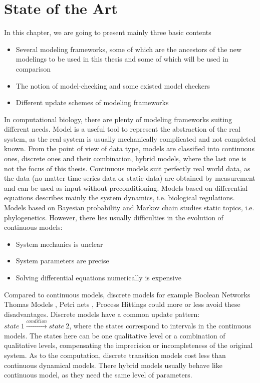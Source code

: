 \chapter{State of the Art}\label{chap:stateOfTheArt}
\begin{mybox}
In this chapter, we are going to present mainly three basic contents
\begin{itemize}
    \item Several modeling frameworks, some of which are the ancestors of the new modelings to be used in this thesis and some of which will be used in comparison
    \item The notion of model-checking and some existed model checkers 
    \item Different update schemes of modeling frameworks
\end{itemize}
\end{mybox}

In computational biology, there are plenty of modeling frameworks suiting different needs.
Model is a useful tool to represent the abstraction of the real system, as the real system is usually mechanically complicated and not completed known.
From the point of view of data type, models are classified into continuous ones, discrete ones and their combination, hybrid models, where the last one is not the focus of this thesis.
Continuous models suit perfectly real world data, as the data (no matter time-series data or static data) are obtained by measurement and can be used as input without preconditioning.
Models based on differential equations \cite{glass1973logical,snoussi1989qualitative,thomas1990biological} describes mainly the system dynamics, i.e. biological regulations.
Models based on Bayesian probability and Markov chain \cite{huelsenbeck2001mrbayes,larget1999markov} studies static topics, i.e. phylogenetics.
However, there lies usually difficulties in the evolution of continuous models:

\begin{itemize}
    \item System mechanics is unclear
    \item System parameters are precise 
    \item Solving differential equations numerically is expensive 
\end{itemize}

Compared to continuous models, discrete models for example Boolean Networks \cite{kauffman1969} Thomas Models \cite{thomas1978}, Petri nets \cite{pinney2003petri}, Process Hittings \cite{pauleve2011} could more or less avoid these disadvantages.
Discrete models have a common update pattern: $state\ 1\xrightarrow{condition}state\ 2$, where the states correspond to intervals in the continuous models. 
The states here can be one qualitative level or a combination of qualitative levels, compensating the imprecision or incompleteness of the original system.
As to the computation, discrete transition models cost less than continuous dynamical models.
There hybrid models \cite{wang2015sreach,lincoln2004symbolic,singhania2011hybrid} usually behave like continuous model, as they need the same level of parameters.
